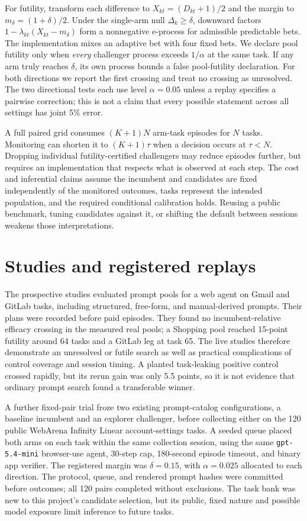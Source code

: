 \documentclass[11pt]{article}
\begin{document}
For futility, transform each difference to $X_{kt}=(D_{kt}+1)/2$ and the margin to $m_\delta=(1+\delta)/2$. Under the single-arm null $\Delta_k\geq\delta$, downward factors $1-\lambda_{kt}(X_{kt}-m_\delta)$ form a nonnegative e-process for admissible predictable bets. The implementation mixes an adaptive bet with four fixed bets. We declare pool futility only when \emph{every} challenger process exceeds $1/\alpha$ at the same task. If any arm truly reaches $\delta$, its own process bounds a false pool-futility declaration. For both directions we report the first crossing and treat no crossing as unresolved. The two directional tests each use level $\alpha=0.05$ unless a replay specifies a pairwise correction; this is not a claim that every possible statement across all settings has joint 5\% error.

A full paired grid consumes $(K+1)N$ arm-task episodes for $N$ tasks. Monitoring can shorten it to $(K+1)\tau$ when a decision occurs at $\tau<N$. Dropping individual futility-certified challengers may reduce episodes further, but requires an implementation that respects what is observed at each step. The cost and inferential claims assume the incumbent and candidates are fixed independently of the monitored outcomes, tasks represent the intended population, and the required conditional calibration holds. Reusing a public benchmark, tuning candidates against it, or shifting the default between sessions weakens those interpretations.

\section{Studies and registered replays}
\label{sec:studies}
The prospective studies evaluated prompt pools for a web agent on Gmail and GitLab tasks, including structured, free-form, and manual-derived prompts. Their plans were recorded before paid episodes. They found no incumbent-relative efficacy crossing in the measured real pools; a Shopping pool reached 15-point futility around 64 tasks and a GitLab leg at task 65. The live studies therefore demonstrate an unresolved or futile search as well as practical complications of control coverage and session timing. A planted task-leaking positive control crossed rapidly, but its rerun gain was only 5.5 points, so it is not evidence that ordinary prompt search found a transferable winner.

A further fixed-pair trial froze two existing prompt-catalog configurations, a baseline incumbent and an explorer challenger, before collecting either on the 120 public WebArena Infinity Linear account-settings tasks. A seeded queue placed both arms on each task within the same collection session, using the same \texttt{gpt-5.4-mini} browser-use agent, 30-step cap, 180-second episode timeout, and binary app verifier. The registered margin was $\delta=0.15$, with $\alpha=0.025$ allocated to each direction. The protocol, queue, and rendered prompt hashes were committed before outcomes; all 120 pairs completed without exclusions. The task bank was new to this project's candidate selection, but its public, fixed nature and possible model exposure limit inference to future tasks.
\end{document}
